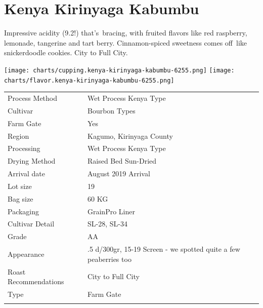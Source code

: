 \documentclass[10pt,twoside,footinclude=true,headinclude=true]{scrbook} %
\newlength{\mysize}
\newcommand{\myfontsize}[1]{
  \setlength{\mysize}{#1pt}
  \fontsize{\mysize}{1.2\mysize}
  \selectfont
}
\begin{document}

\chapter*{Kenya Kirinyaga Kabumbu}
 
\begin{addmargin}[2.2em]{2.2em}
\small
\justify
Impressive acidity (9.2!) that's bracing, with fruited flavors like red raspberry, lemonade, tangerine and tart berry. Cinnamon-spiced sweetness comes off like snickerdoodle cookies. City to Full City.
\end{addmargin}

\centering
\vspace{2em}
\texttt{[image: charts/cupping.kenya-kirinyaga-kabumbu-6255.png]}
\texttt{[image: charts/flavor.kenya-kirinyaga-kabumbu-6255.png]}

\vspace{1em}
\begin{table}[htbp]
\myfontsize{7}
\hspace*{2.2em}
\begin{tabular}{ >{\raggedleft\arraybackslash}p{3.6cm}!{\color{lightgray}\vrule}p{7cm} }
\hline
  Process Method & Wet Process Kenya Type \\
  \hline
  Cultivar & Bourbon Types \\
  \hline
  Farm Gate & Yes \\
  \hline
  Region & Kagumo, Kirinyaga County \\
  \hline
  Processing & Wet Process Kenya Type \\
  \hline
  Drying Method & Raised Bed Sun-Dried \\
  \hline
  Arrival date & August 2019 Arrival \\
  \hline
  Lot size & 19 \\
  \hline
  Bag size & 60 KG \\
  \hline
  Packaging & GrainPro Liner \\
  \hline
  Cultivar Detail & SL-28, SL-34 \\
  \hline
  Grade & AA \\
  \hline
  Appearance & .5 d/300gr, 15-19 Screen - we spotted quite a few peaberries too \\
  \hline
  Roast Recommendations & City to Full City \\
  \hline
  Type & Farm Gate \\
  \hline

\end{tabular}
\end{table}
\end{document}
